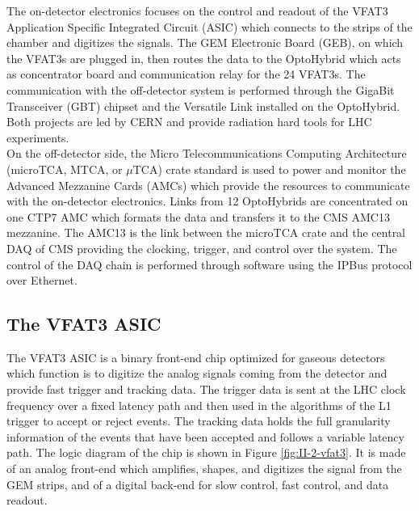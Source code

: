     The on-detector electronics focuses on the control and readout of the VFAT3 Application Specific Integrated Circuit (ASIC) which connects to the strips of the chamber and digitizes the signals. The GEM Electronic Board (GEB), on which the VFAT3s are plugged in, then routes the data to the OptoHybrid which acts as concentrator board and communication relay for the 24 VFAT3s. The communication with the off-detector system is performed through the GigaBit Transceiver (GBT) chipset and the Versatile Link installed on the OptoHybrid. Both projects are led by CERN and provide radiation hard tools for LHC experiments. \\

    On the off-detector side, the Micro Telecommunications Computing Architecture (microTCA, MTCA, or $\mu$TCA) \cite{PICMG} crate standard is used to power and monitor the Advanced Mezzanine Cards (AMCs) which provide the resources to communicate with the on-detector electronics. Links from 12 OptoHybrids are concentrated on one CTP7 AMC which formats the data and transfers it to the CMS AMC13 mezzanine. The AMC13 is the link between the microTCA crate and the central DAQ of CMS providing the clocking, trigger, and control over the system. The control of the DAQ chain is performed through software using the IPBus protocol over Ethernet.

    \subsection{The VFAT3 ASIC}

      The VFAT3 ASIC is a binary front-end chip optimized for gaseous detectors which function is to digitize the analog signals coming from the detector and provide fast trigger and tracking data. The trigger data is sent at the LHC clock frequency over a fixed latency path and then used in the algorithms of the L1 trigger to accept or reject events. The tracking data holds the full granularity information of the events that have been accepted and follows a variable latency path. The logic diagram of the chip is shown in Figure \ref{fig:II-2-vfat3}. It is made of an analog front-end which amplifies, shapes, and digitizes the signal from the GEM strips, and of a digital back-end for slow control, fast control, and data readout. \\

